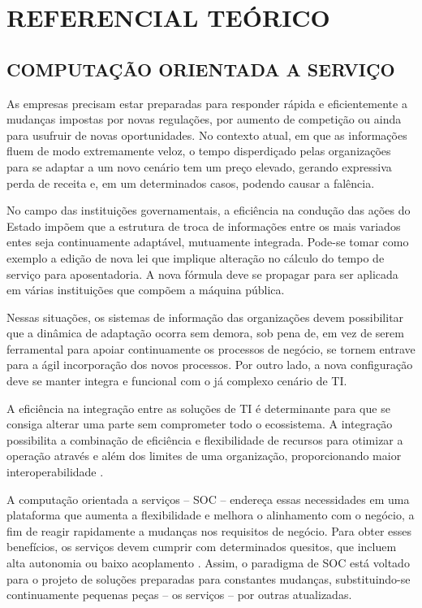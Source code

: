  
\chapter{REFERENCIAL TEÓRICO}
\vspace{-6mm}

\section{COMPUTAÇÃO ORIENTADA A SERVIÇO}
\vspace{-6mm}


As empresas precisam estar preparadas para responder rápida e
eficientemente a mudanças impostas por novas regulações, por aumento de
competição ou ainda para usufruir de novas oportunidades. No contexto atual, em que as
informações fluem de modo extremamente veloz, o tempo disperdiçado pelas organizações para se
adaptar a um novo cenário tem um preço elevado, gerando expressiva perda de
receita e, em um determinados casos, podendo causar a falência.

No campo das instituições governamentais, a eficiência na condução das ações do
Estado impõem que a estrutura de troca de informações entre os mais variados
entes seja continuamente adaptável, mutuamente integrada. Pode-se tomar como
exemplo a edição de nova lei que implique alteração no cálculo do tempo de
serviço para aposentadoria. A nova fórmula deve se propagar para ser
aplicada em várias instituições que compõem a máquina pública.

Nessas situações, os sistemas de informação das organizações devem possibilitar
que a dinâmica de adaptação ocorra sem demora, sob pena de, em vez de serem
ferramental para apoiar continuamente os processos de negócio, se tornem entrave
para a ágil incorporação dos novos processos. Por outro lado, a nova
configuração deve se manter integra e funcional com o já complexo cenário de TI.

A eficiência na integração entre as soluções de TI é determinante para que se
consiga alterar uma parte sem comprometer todo o ecossistema. A integração
possibilita a combinação de eficiência e flexibilidade de recursos para otimizar
a operação através e além dos limites de uma organização, proporcionando maior
interoperabilidade \cite{papazoglou2008service}.

A computação orientada a serviços -- SOC -- endereça essas necessidades em uma
plataforma que aumenta a flexibilidade e melhora o alinhamento com o negócio, a
fim de reagir rapidamente a mudanças nos requisitos de negócio. Para obter esses
benefícios, os serviços devem cumprir com determinados quesitos, que incluem
alta autonomia ou baixo acoplamento \cite{erl2008soa}. Assim, o paradigma de SOC
está voltado para o projeto de soluções preparadas para constantes mudanças,
substituindo-se continuamente pequenas peças -- os serviços -- por outras
atualizadas.


